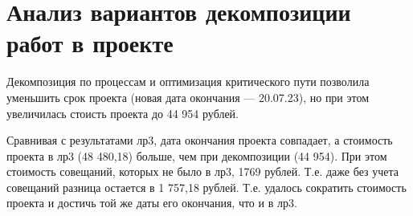 
\clearpage
\section{Анализ вариантов декомпозиции работ в проекте}

Декомпозиция по процессам и оптимизация критического пути позволила уменьшить срок проекта (новая дата окончания --- 20.07.23), 
но при этом увеличилась стоисть проекта до 44 954 рублей. 



\newpage
Сравнивая с результатами лр3, дата окончания проекта совпадает, а стоимость проекта в лр3 (48 480,18) больше, чем при декомпозиции (44 954).
При этом стоимость совещаний, которых не было в лр3, 1769 рублей. Т.е. даже без учета совещаний разница остается в 1 757,18 рублей. Т.е. удалось сократить стоимость проекта 
и достичь той же даты его окончания, что и в лр3.








